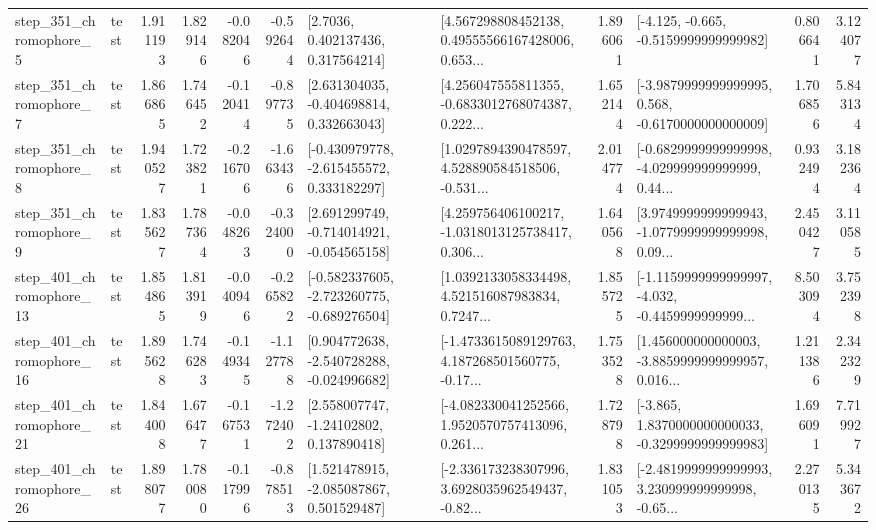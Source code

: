 \begin{tabular}{llrrrrllrlrr}
   step\_351\_chromophore\_5 &      test &      1.911193 &    1.829146 &     -0.082046 & -0.592644 &          [2.7036, 0.402137436, 0.317564214] &  [4.567298808452138, 0.49555566167428006, 0.653... &       1.896061 &              [-4.125, -0.665, -0.5159999999999982] &            0.806641 &          3.124077 \\
   step\_351\_chromophore\_7 &      test &      1.866865 &    1.746452 &     -0.120414 & -0.897735 &    [2.631304035, -0.404698814, 0.332663043] &  [4.256047555811355, -0.6833012768074387, 0.222... &       1.652144 &  [-3.9879999999999995, 0.568, -0.6170000000000009] &            1.706856 &          5.843134 \\
   step\_351\_chromophore\_8 &      test &      1.940527 &    1.723821 &     -0.216706 & -1.663436 &   [-0.430979778, -2.615455572, 0.333182297] &  [1.0297894390478597, 4.528890584518506, -0.531... &       2.014774 &  [-0.6829999999999998, -4.029999999999999, 0.44... &            0.932494 &          3.182364 \\
   step\_351\_chromophore\_9 &      test &      1.835627 &    1.787364 &     -0.048263 & -0.324000 &   [2.691299749, -0.714014921, -0.054565158] &  [4.259756406100217, -1.0318013125738417, 0.306... &       1.640568 &  [3.9749999999999943, -1.0779999999999998, 0.09... &            2.450427 &          3.110585 \\
  step\_401\_chromophore\_13 &      test &      1.854865 &    1.813919 &     -0.040946 & -0.265822 &  [-0.582337605, -2.723260775, -0.689276504] &  [1.0392133058334498, 4.521516087983834, 0.7247... &       1.855725 &  [-1.1159999999999997, -4.032, -0.4459999999999... &            8.503094 &          3.752398 \\
  step\_401\_chromophore\_16 &      test &      1.895628 &    1.746283 &     -0.149345 & -1.127788 &   [0.904772638, -2.540728288, -0.024996682] &  [-1.4733615089129763, 4.187268501560775, -0.17... &       1.753528 &  [1.456000000000003, -3.8859999999999957, 0.016... &            1.211386 &          2.342329 \\
  step\_401\_chromophore\_21 &      test &      1.844008 &    1.676477 &     -0.167531 & -1.272402 &     [2.558007747, -1.24102802, 0.137890418] &  [-4.082330041252566, 1.9520570757413096, 0.261... &       1.728798 &  [-3.865, 1.8370000000000033, -0.3299999999999983] &            1.696091 &          7.719927 \\
  step\_401\_chromophore\_26 &      test &      1.898077 &    1.780080 &     -0.117996 & -0.878513 &    [1.521478915, -2.085087867, 0.501529487] &  [-2.336173238307996, 3.6928035962549437, -0.82... &       1.831053 &  [-2.4819999999999993, 3.230999999999998, -0.65... &            2.270135 &          5.343672 \\

\end{tabular}

